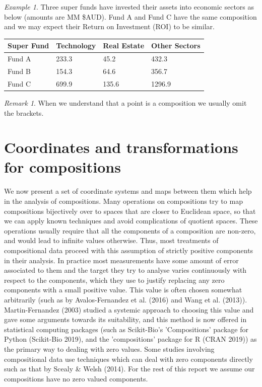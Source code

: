 \documentclass[BSc]{usydthesis}
\numberwithin{equation}{chapter}
\theoremstyle{remark}
\newtheorem{Remark}[equation]{Remark}
\newtheorem{Example}[equation]{Example}
\begin{document}
\begin{Example}
Three super funds have invested their assets into economic sectors as below (amounts are MM \$AUD). Fund A and Fund C have the same composition and we may expect their Return on Investment (ROI) to be similar. 
 \begin{table}[hbt!]
\centering
\begin{tabular}{|l|l|l|l|} 
\hline
Super Fund & Technology & Real Estate & Other Sectors   \\ 
\hline
Fund A     & 233.3      & 45.2        & 432.3           \\
Fund B     & 154.3      & 64.6        & 356.7           \\
Fund C     & 699.9      & 135.6       & 1296.9          \\
\hline
\end{tabular}
\end{table}
\end{Example}
\begin{Remark}
When we understand that a point is a composition we usually omit the brackets. 
\end{Remark}

\section{Coordinates and transformations for compositions}

We now present a set of coordinate systems and maps between them which help in the analysis of compositions. Many operations on compositions try to map compositions bijectively over to spaces that are closer to Euclidean space, so that we can apply known techniques and avoid complications of quotient spaces. These operations usually require that all the components of a composition are non-zero, and would lead to infinite values otherwise. Thus, most treatments of compositional data proceed with this assumption of strictly positive components in their analysis. In practice most measurements have some amount of error associated to them and the target they try to analyse varies continuously with respect to the components, which they use to justify replacing any zero components with a small positive value. This value is often chosen somewhat arbitrarily (such as by Avalos-Fernandez et al. (2016) and Wang et al. (2013)). Martin-Fernandez (2003) studied a systemic approach to choosing this value and gave some arguments towards its suitability, and this method is now offered in statistical computing packages (such as Scikit-Bio's 'Compositions' package for Python (Scikit-Bio 2019), and the 'compositions' package for R (CRAN 2019)) as the primary way to dealing with zero values. Some studies involving compositional data use techniques which can deal with zero components directly such as that by Scealy \& Welsh (2014). For the rest of this report we assume our compositions have no zero valued components. 
\end{document}
